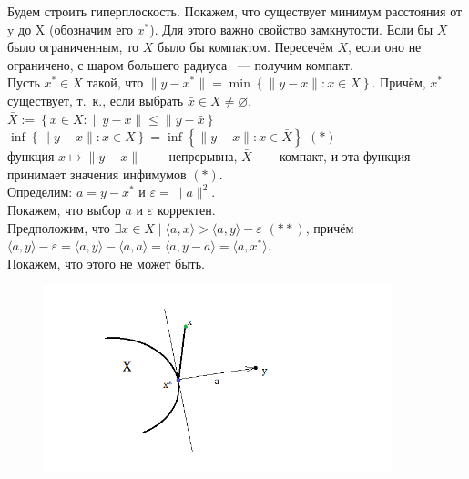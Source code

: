 \noindent Будем строить гиперплоскость. Покажем, что существует минимум расстояния от y до X (обозначим его $x^{\ast}$). Для этого важно свойство замкнутости. Если бы $X$ было ограниченным, то $X$ было бы компактом. Пересечём $X$, если оно не ограничено, с шаром большего радиуса ~--- получим компакт.\\

\noindent Пусть $x^{\ast} \in X$ такой, что $\parallel y - x^{\ast} \parallel = \min \left\{\parallel y - x \parallel : x \in X \right\}$. Причём, $x^{\ast}$ существует, т.~к., если выбрать $\bar{x}\in X \neq \varnothing$,\\
$\bar{X}:=\left\{ x\in X: \parallel y-x \parallel \leq \parallel y - \bar{x} \right\}$\\
$\inf \left\{ \parallel y - x\parallel : x\in X \right\} = \inf \left\{ \parallel y - x\parallel : x\in \bar{X} \right\}$ $(\ast)$\\
функция $x\longmapsto \parallel y - x\parallel$ ~--- непрерывна, $\bar{X}$ ~--- компакт, и эта функция принимает значения инфимумов $(\ast)$.\\

\noindent Определим: $a = y - x^{\ast}$ и $\varepsilon = \parallel a \parallel ^2$.\\
Покажем, что выбор $a$ и $\varepsilon$ корректен.\\
Предположим, что $\exists x\in X \mid \langle a,x\rangle > \langle a,y \rangle - \varepsilon $ $(\ast\ast)$, причём $ \langle a,y \rangle - \varepsilon = \langle a,y \rangle - \langle a,a \rangle = \langle a,y-a \rangle = \langle a,x^{\ast} \rangle$.\\
Покажем, что этого не может быть.\\

\begin{figure}[h!]
\centering
\includegraphics[width=0.9\textwidth]{800px-Beweis2}
\label{fig:}
\end{figure}


